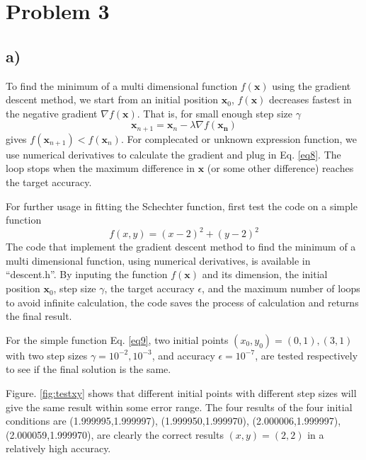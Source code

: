 \documentclass[12pt, graphicx]{article}
\begin{document}
\section*{Problem 3}
\subsection*{a)}
To find the minimum of a multi dimensional function $f(\mathbf{x})$ using the gradient descent method, we start from an initial position $\mathbf{x}_0$, $f(\mathbf{x})$ decreases fastest in the negative gradient $\nabla f(\mathbf{x})$. That is, for small enough step size $\gamma$ 
\begin{equation}
\mathbf{x}_{n+1}=\mathbf{x}_n-\lambda\nabla f(\mathbf{x_n})
\label{eq8}
\end{equation}
gives $f(\mathbf{x}_{n+1})<f(\mathbf{x}_n)$. For complecated or unknown expression function, we use numerical derivatives  to calculate the gradient and plug in Eq. \ref{eq8}. The loop stops when the maximum difference in $\mathbf{x}$ (or some other difference) reaches the target accuracy. \par
For further usage in fitting the Schechter function, first test the code on a simple function
\begin{equation}
f(x,y)=(x-2)^2+(y-2)^2
\label{eq9}
\end{equation}
The code that implement the gradient descent method to find the minimum of a multi dimensional function, using numerical derivatives, is available in \textquotedblleft descent.h\textquotedblright. By inputing the function $f(\mathbf{x})$ and its dimension, the initial position $\mathbf{x}_0$, step size $\gamma$, the target accuracy $\epsilon$, and the maximum number of loops to avoid infinite calculation, the code saves the process of calculation and returns the final result. \par
For the simple function Eq. \ref{eq9}, two initial points $(x_0,y_0)=(0,1), (3,1)$ with two step sizes $\gamma=10^{-2},10^{-3}$, and accuracy $\epsilon=10^{-7}$, are tested respectively to see if the final solution is the same. \par
Figure. \ref{fig:testxy} shows that different initial points with different step sizes will give the same result within some error range. The four results of the four initial conditions are (1.999995,1.999997), (1.999950,1.999970), (2.000006,1.999997), (2.000059,1.999970), are clearly the correct results $(x,y)=(2,2)$ in a relatively high accuracy. 
\end{document}
